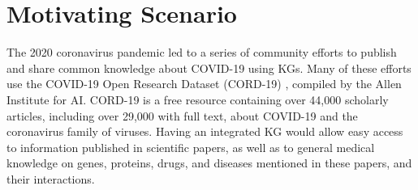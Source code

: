 \documentclass[runningheads]{llncs}
\newcommand{\kibitz}[2]{%
{\color{#1}#2}{}%
}
\newcommand{\filip}[1]{\kibitz{purple}{[FI:#1]}} %
\newcommand{\DS}[1]{\kibitz{blue}{[DS: #1]}} %
\newcommand{\DG}[1]{\kibitz{red}{[DG: #1]}} %
\begin{document}



\section{Motivating Scenario}
\label{sec:scenario}



The 2020 coronavirus pandemic led to a series of community efforts to publish and share common knowledge about COVID-19 using KGs. Many of these efforts use the COVID-19 Open Research Dataset (CORD-19) \cite{Wang2020}, compiled by the Allen Institute for AI. CORD-19 is a free resource containing over 44,000 scholarly articles, including over 29,000 with full text, about COVID-19 and the coronavirus family of viruses. Having an integrated KG would allow easy access to information published in scientific papers, as well as to general medical knowledge on genes, proteins, drugs, and diseases mentioned in these papers, and their interactions.
\end{document}
